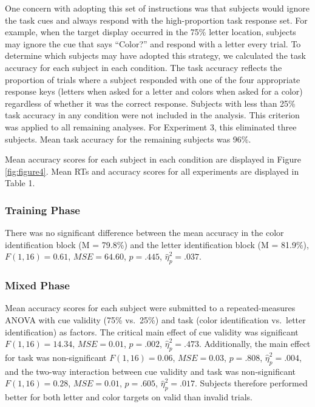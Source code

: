 \documentclass[english,,man,floatsintext]{apa6}
\begin{document}
One concern with adopting this set of instructions was that subjects
would ignore the task cues and always respond with the high-proportion
task response set. For example, when the target display occurred in the
75\% letter location, subjects may ignore the cue that says
\enquote{Color?} and respond with a letter every trial. To determine
which subjects may have adopted this strategy, we calculated the task
accuracy for each subject in each condition. The task accuracy reflects
the proportion of trials where a subject responded with one of the four
appropriate response keys (letters when asked for a letter and colors
when asked for a color) regardless of whether it was the correct
response. Subjects with less than 25\% task accuracy in any condition
were not included in the analysis. This criterion was applied to all
remaining analyses. For Experiment 3, this eliminated three subjects.
Mean task accuracy for the remaining subjects was 96\%.

Mean accuracy scores for each subject in each condition are displayed in
Figure \ref{fig:figure4}. Mean RTs and accuracy scores for all
experiments are displayed in Table 1.

\subsubsection{Training Phase}\label{training-phase}

There was no significant difference between the mean accuracy in the
color identification block (M = 79.8\%) and the letter identification
block (M = 81.9\%), \(F(1, 16) = 0.61\), \(\mathit{MSE} = 64.60\),
\(p = .445\), \(\hat{\eta}^2_p = .037\).

\subsubsection{Mixed Phase}\label{mixed-phase}

Mean accuracy scores for each subject were submitted to a
repeated-measures ANOVA with cue validity (75\% vs.~25\%) and task
(color identification vs.~letter identification) as factors. The
critical main effect of cue validity was significant
\(F(1, 16) = 14.34\), \(\mathit{MSE} = 0.01\), \(p = .002\),
\(\hat{\eta}^2_p = .473\). Additionally, the main effect for task was
non-significant \(F(1, 16) = 0.06\), \(\mathit{MSE} = 0.03\),
\(p = .808\), \(\hat{\eta}^2_p = .004\), and the two-way interaction
between cue validity and task was non-significant \(F(1, 16) = 0.28\),
\(\mathit{MSE} = 0.01\), \(p = .605\), \(\hat{\eta}^2_p = .017\).
Subjects therefore performed better for both letter and color targets on
valid than invalid trials.
\end{document}
